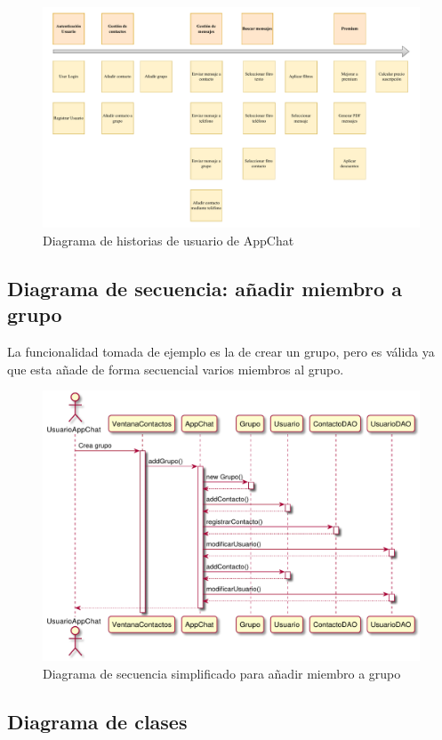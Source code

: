 \documentclass[11pt]{article}
\begin{document}
\begin{figure}[h]
    \centering
    \includegraphics[width=0.8\linewidth]{figures/user-story-mapping.drawio-2.pdf}
    \caption{Diagrama de historias de usuario de AppChat}
    \label{fig:user-story-mapping}
\end{figure}

\subsection{Diagrama de secuencia: añadir miembro a grupo}

La funcionalidad tomada de ejemplo es la de crear un grupo, pero es válida ya que esta añade de forma secuencial varios miembros al grupo.

\begin{figure}[H]
	\centering
	\includegraphics[width=0.5\linewidth]{figures/crear_grupo}
	\caption{Diagrama de secuencia simplificado para añadir miembro a grupo}
	\label{fig:crear-grupo}
\end{figure}

\subsection{Diagrama de clases}
\end{document}
